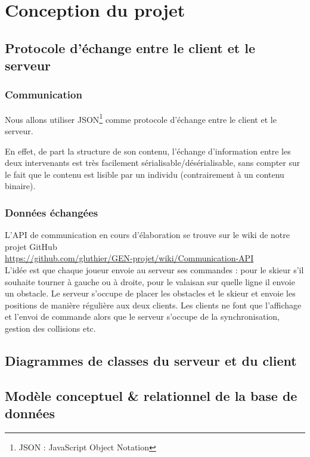 \documentclass[a4paper,11pt]{article}
\begin{document}
	
	\section{Conception du projet}
	
	
	\subsection{Protocole d'échange entre le client et le serveur}
	\subsubsection{Communication}
	Nous allons utiliser JSON\footnote{JSON : JavaScript Object Notation} comme protocole d'échange entre le client et le serveur. \par
	En effet, de part la structure de son contenu, l'échange d'information entre les deux intervenants est très facilement sérialisable/désérialisable, sans compter sur le fait que le contenu est lisible par un individu (contrairement à un contenu binaire).
	
	\subsubsection{Données échangées}
	L'API de communication en cours d'élaboration se trouve sur le wiki de notre projet GitHub \\ \url{https://github.com/gluthier/GEN-projet/wiki/Communication-API} \\
	L'idée est que chaque joueur envoie au serveur ses commandes : pour le skieur s'il souhaite tourner à gauche ou à droite, pour le valaisan sur quelle ligne il envoie un obstacle. Le serveur s'occupe de placer les obstacles et le skieur et envoie les positions de manière régulière aux deux clients. Les clients ne font que l'affichage et l'envoi de commande alors que le serveur s'occupe de la synchronisation, gestion des collisions etc.
	
	
	\subsection{Diagrammes de classes du serveur et du client}
	
	\subsection{Modèle conceptuel \& relationnel de la base de données}
	
\end{document}
